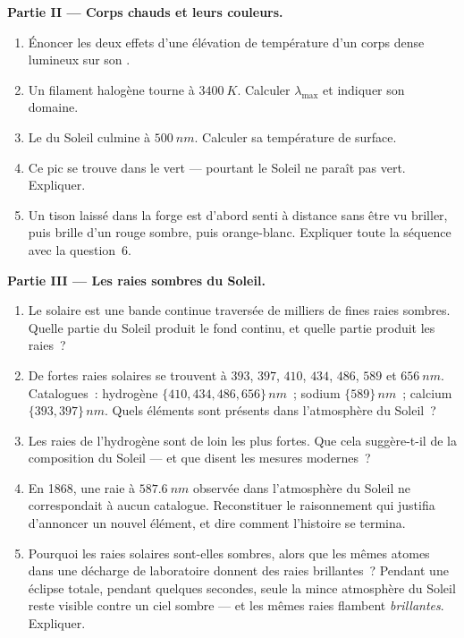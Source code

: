 \begin{problem}
\medskip
\noindent\textbf{Partie II --- Corps chauds et leurs couleurs.}
\begin{enumerate}[resume]
  \item Énoncer les deux effets d'une élévation de température d'un
        corps dense lumineux sur son .
  \item Un filament halogène tourne à $\qty{3400}{K}$. Calculer
        $\lambda_{\max}$ et indiquer son domaine.
  \item Le  du Soleil culmine à $\qty{500}{nm}$.
        Calculer sa température de surface.
  \item Ce pic se trouve dans le vert --- pourtant le Soleil ne paraît
        pas vert. Expliquer.
  \item Un tison laissé dans la forge est d'abord senti à distance sans
        être vu briller, puis brille d'un rouge sombre, puis
        orange-blanc. Expliquer toute la séquence avec la question~6.
\end{enumerate}

\medskip
\noindent\textbf{Partie III --- Les raies sombres du Soleil.}
\begin{enumerate}[resume]
  \item Le  solaire est une bande continue traversée de
        milliers de fines raies sombres. Quelle partie du Soleil
        produit le fond continu, et quelle partie produit les raies~?
  \item De fortes raies solaires se trouvent à $393$, $397$, $410$,
        $434$, $486$, $589$ et $\qty{656}{nm}$. Catalogues~: hydrogène
        $\{410, 434, 486, 656\}\,\unit{nm}$~; sodium
        $\{589\}\,\unit{nm}$~; calcium $\{393, 397\}\,\unit{nm}$.
        Quels éléments sont présents dans l'atmosphère du Soleil~?
  \item Les raies de l'hydrogène sont de loin les plus fortes. Que cela
        suggère-t-il de la composition du Soleil --- et que disent les
        mesures modernes~?
  \item En 1868, une raie à $\qty{587.6}{nm}$ observée dans
        l'atmosphère du Soleil ne correspondait à aucun catalogue.
        Reconstituer le raisonnement qui justifia d'annoncer un nouvel
        élément, et dire comment l'histoire se termina.
  \item Pourquoi les raies solaires sont-elles sombres, alors que les
        mêmes atomes dans une décharge de laboratoire donnent des raies
        brillantes~? Pendant une éclipse totale, pendant quelques
        secondes, seule la mince atmosphère du Soleil reste visible
        contre un ciel sombre --- et les mêmes raies flambent
        \emph{brillantes}. Expliquer.
\end{enumerate}


\end{problem}
